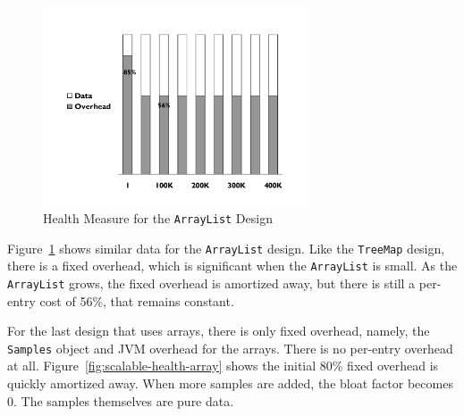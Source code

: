 
\begin{figure}
  \centering
   \includegraphics[width=0.7\textwidth]{part1/Figures/memoryhealth/scalable-health-arraylist}
  \caption{Health Measure for the \texttt{ArrayList} Design }
  \label{fig:scalable-health-arraylist}
\end{figure}

Figure~\ref{fig:scalable-health-arraylist} shows similar data for the \texttt{ArrayList} design. Like the \texttt{TreeMap} design, there is a fixed overhead, which is significant when the \texttt{ArrayList} is small. As the \texttt{ArrayList} grows, the fixed overhead is amortized away, but there is still a per-entry cost of 56\%, that remains constant. 

For the last design that uses arrays, there is only fixed overhead, namely, the \texttt{Samples} object and JVM overhead for the arrays. There is no per-entry overhead at all. Figure~\ref{fig:scalable-health-array} shows the initial 80\% fixed overhead is quickly amortized away. When more samples are added, the bloat factor becomes 0. The samples themselves are pure data.


